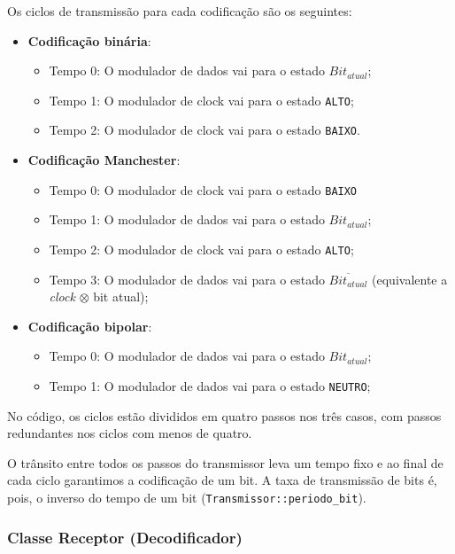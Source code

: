 \documentclass[titlepage,twocolumn]{article}
\begin{document}
Os ciclos de transmissão para cada codificação são os se\-guintes:

\begin{itemize}
    \item \textbf{Codificação binária}:
    \begin{itemize}
        \item Tempo 0: O modulador de dados vai para o estado $Bit_{atual}$;
        \item Tempo 1: O modulador de clock vai para o estado \texttt{ALTO};
        \item Tempo 2: O modulador de clock vai para o estado \texttt{BAIXO}.
    \end{itemize}
    \item \textbf{Codificação Manchester}:
    \begin{itemize}
        \item Tempo 0: O modulador de clock vai para o estado \texttt{BAIXO}
        \item Tempo 1: O modulador de dados vai para o estado $Bit_{atual}$;
        \item Tempo 2: O modulador de clock vai para o estado \texttt{ALTO};
        \item Tempo 3: O modulador de dados vai para o estado $\overline{Bit_{atual}}$  (equivalente a \textit{clock} $\otimes$ bit atual);
    \end{itemize}
    \item \textbf{Codificação bipolar}:
    \begin{itemize}
        \item Tempo 0: O modulador de dados vai para o estado $Bit_{atual}$;
        \item Tempo 1: O modulador de dados vai para o estado \texttt{NEUTRO};
    \end{itemize}
\end{itemize}

No código, os ciclos estão divididos em quatro passos nos três casos, com passos redundantes nos ciclos com menos de quatro.

O trânsito entre todos os passos do transmissor leva um tempo fixo e ao final de cada ciclo garantimos a codificação de um bit. A taxa de transmissão de bits é, pois, o inverso do tempo de um bit (\texttt{Transmissor::periodo\_bit}).

\subsubsection{Classe Receptor (Decodificador)}
\end{document}
